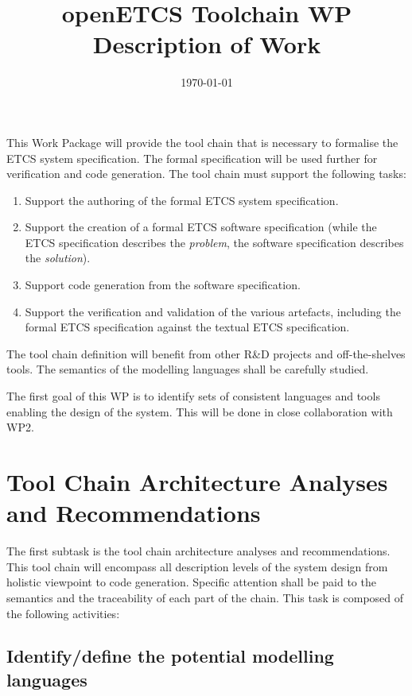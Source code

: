 \documentclass[11pt, a4paper]{article}
\title{openETCS Toolchain WP Description of Work}
\date{\today}
\begin{document}
\maketitle

This Work Package will provide the tool chain that is necessary to formalise the ETCS system specification.  The formal specification will be used further for verification and code generation.  The tool chain must support the following tasks:

\begin{enumerate}
\item Support the authoring of the formal ETCS system specification.

\item Support the creation of a formal ETCS software specification (while the ETCS specification describes the \emph{problem}, the software specification describes the \emph{solution}).

\item Support code generation from the software specification.

\item Support the verification and validation of the various artefacts, including the formal ETCS specification against the textual ETCS specification.
\end{enumerate}

The tool chain definition will benefit from other R\&D projects and off-the-shelves tools. The semantics of the modelling languages shall be carefully studied.

The first goal of this WP is to identify sets of consistent languages and tools enabling the design of the system.  This will be done in close collaboration with WP2.

\section{Tool Chain Architecture Analyses and Recommendations}

The first subtask is the tool chain architecture analyses and recommendations. This tool chain will encompass all description levels of the system design from holistic viewpoint to code generation. Specific attention shall be paid to the semantics and the traceability of each part of the chain. This task is composed of the following activities:

\subsection{Identify/define the potential modelling languages}
\end{document}
